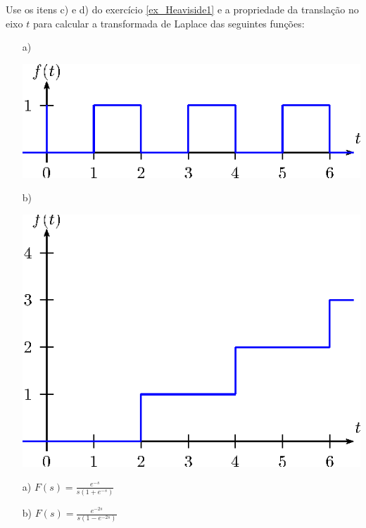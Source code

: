 \begin{exer} Use os itens c) e d) do exercício \ref{ex_Heaviside1} e a propriedade da translação no eixo $t$ para calcular a transformada de Laplace das seguintes funções:
\begin{itemize}
\item[a)]~
\begin{center}

\includegraphics{cap_trans_int/pics/figura_24}\end{center}
\item[b)]~
\begin{center}

\includegraphics{cap_trans_int/pics/figura_25}\end{center}
\end{itemize}
\end{exer}
\begin{resp}
 \begin{itemize}
        \item[a)] $\displaystyle F(s)=\frac{e^{-s}}{s(1+e^{-s})}$
        \item[b)] $\displaystyle F(s)=\frac{e^{-2s}}{s(1-e^{-2s})}$
 \end{itemize}
\end{resp}

